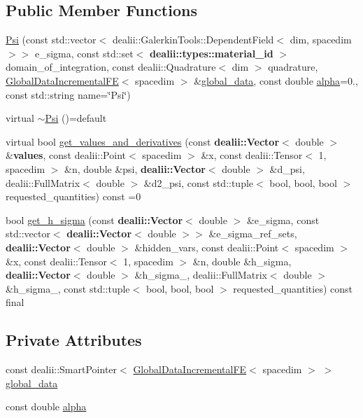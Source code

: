 \subsection*{Public Member Functions}
\begin{DoxyCompactItemize}
\item 
\hyperlink{classincremental_f_e_1_1_psi_ae8a4aab5ee5381799379b8de2bc1f67d}{Psi} (const std\+::vector$<$ dealii\+::\+Galerkin\+Tools\+::\+Dependent\+Field$<$ dim, spacedim $>$$>$ e\+\_\+sigma, const std\+::set$<$ {\bf dealii\+::types\+::material\+\_\+id} $>$ domain\+\_\+of\+\_\+integration, const dealii\+::\+Quadrature$<$ dim $>$ quadrature, \hyperlink{classincremental_f_e_1_1_global_data_incremental_f_e}{Global\+Data\+Incremental\+FE}$<$ spacedim $>$ \&\hyperlink{classincremental_f_e_1_1_psi_ae77b2e13385734b19d6ee445c477a6eb}{global\+\_\+data}, const double \hyperlink{classincremental_f_e_1_1_psi_a0d59fde4728962fa75449a3444341dcf}{alpha}=0., const std\+::string name=\char`\"{}Psi\char`\"{})
\item 
virtual \hyperlink{classincremental_f_e_1_1_psi_a22a7b3d4fd98f6d0cff79623e13e0939}{$\sim$\+Psi} ()=default
\item 
virtual bool \hyperlink{classincremental_f_e_1_1_psi_a2622e8f84590e8a821984181e31fbc76}{get\+\_\+values\+\_\+and\+\_\+derivatives} (const {\bf dealii\+::\+Vector}$<$ double $>$ \&{\bf values}, const dealii\+::\+Point$<$ spacedim $>$ \&x, const dealii\+::\+Tensor$<$ 1, spacedim $>$ \&n, double \&psi, {\bf dealii\+::\+Vector}$<$ double $>$ \&d\+\_\+psi, dealii\+::\+Full\+Matrix$<$ double $>$ \&d2\+\_\+psi, const std\+::tuple$<$ bool, bool, bool $>$ requested\+\_\+quantities) const =0
\item 
bool \hyperlink{classincremental_f_e_1_1_psi_ab4e1abcaff9497eac5eb3c953f2c303a}{get\+\_\+h\+\_\+sigma} (const {\bf dealii\+::\+Vector}$<$ double $>$ \&e\+\_\+sigma, const std\+::vector$<$ {\bf dealii\+::\+Vector}$<$ double $>$$>$ \&e\+\_\+sigma\+\_\+ref\+\_\+sets, {\bf dealii\+::\+Vector}$<$ double $>$ \&hidden\+\_\+vars, const dealii\+::\+Point$<$ spacedim $>$ \&x, const dealii\+::\+Tensor$<$ 1, spacedim $>$ \&n, double \&h\+\_\+sigma, {\bf dealii\+::\+Vector}$<$ double $>$ \&h\+\_\+sigma\+\_, dealii\+::\+Full\+Matrix$<$ double $>$ \&h\+\_\+sigma\+\_, const std\+::tuple$<$ bool, bool, bool $>$ requested\+\_\+quantities) const final
\end{DoxyCompactItemize}
\subsection*{Private Attributes}
\begin{DoxyCompactItemize}
\item 
const dealii\+::\+Smart\+Pointer$<$ \hyperlink{classincremental_f_e_1_1_global_data_incremental_f_e}{Global\+Data\+Incremental\+FE}$<$ spacedim $>$ $>$ \hyperlink{classincremental_f_e_1_1_psi_ae77b2e13385734b19d6ee445c477a6eb}{global\+\_\+data}
\item 
const double \hyperlink{classincremental_f_e_1_1_psi_a0d59fde4728962fa75449a3444341dcf}{alpha}
\end{DoxyCompactItemize}


